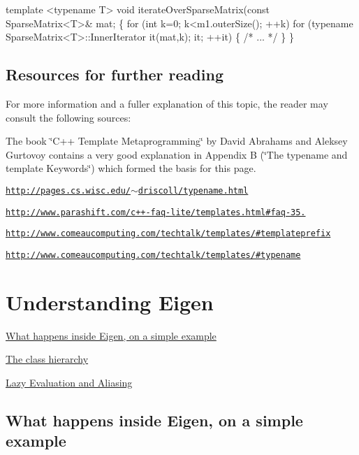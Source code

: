 \begin{DoxyCode}
\textcolor{keyword}{template} <\textcolor{keyword}{typename} T>
\textcolor{keywordtype}{void} iterateOverSparseMatrix(\textcolor{keyword}{const} SparseMatrix<T>& mat;
\{
  \textcolor{keywordflow}{for} (\textcolor{keywordtype}{int} k=0; k<m1.outerSize(); ++k)
    \textcolor{keywordflow}{for} (\textcolor{keyword}{typename} SparseMatrix<T>::InnerIterator it(mat,k); it; ++it)
    \{
      \textcolor{comment}{/* ... */}
    \}
\}
\end{DoxyCode}
\hypertarget{_topic_template_keyword_TopicTemplateKeywordResources}{}\subsection{Resources for further reading}\label{_topic_template_keyword_TopicTemplateKeywordResources}
For more information and a fuller explanation of this topic, the reader may consult the following sources\+:
\begin{DoxyItemize}
\item The book \char`\"{}\+C++ Template Metaprogramming\char`\"{} by David Abrahams and Aleksey Gurtovoy contains a very good explanation in Appendix B (\char`\"{}\+The typename and template Keywords\char`\"{}) which formed the basis for this page.
\item \href{http://pages.cs.wisc.edu/~driscoll/typename.html}{\tt http\+://pages.\+cs.\+wisc.\+edu/$\sim$driscoll/typename.\+html}
\item \href{http://www.parashift.com/c++-faq-lite/templates.html#faq-35.18}{\tt http\+://www.\+parashift.\+com/c++-\/faq-\/lite/templates.\+html\#faq-\/35.}
\item \href{http://www.comeaucomputing.com/techtalk/templates/#templateprefix}{\tt http\+://www.\+comeaucomputing.\+com/techtalk/templates/\#templateprefix}
\item \href{http://www.comeaucomputing.com/techtalk/templates/#typename}{\tt http\+://www.\+comeaucomputing.\+com/techtalk/templates/\#typename} 
\end{DoxyItemize}\hypertarget{UserManual_UnderstandingEigen}{}\section{Understanding Eigen}\label{UserManual_UnderstandingEigen}

\begin{DoxyItemize}
\item \hyperlink{TopicInsideEigenExample}{What happens inside Eigen, on a simple example}
\item \hyperlink{TopicClassHierarchy}{The class hierarchy}
\item \hyperlink{TopicLazyEvaluation}{Lazy Evaluation and Aliasing} 
\end{DoxyItemize}\hypertarget{TopicInsideEigenExample}{}\subsection{What happens inside Eigen, on a simple example}\label{TopicInsideEigenExample}





